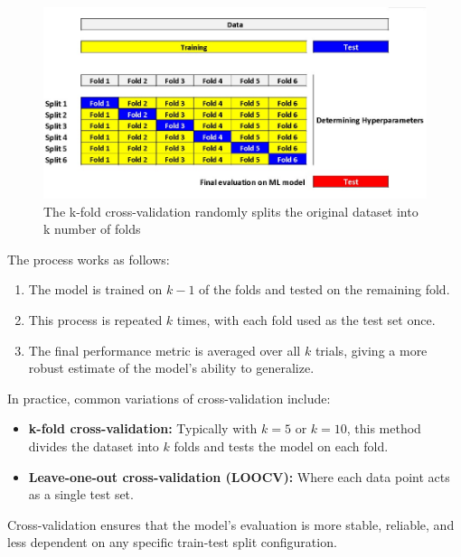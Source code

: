 \documentclass{llncs}
\begin{document}
\begin{figure}[h!]
	\begin{center}  %
		\includegraphics[width=1\textwidth]{images/Cross.jpg}
		\caption{The k-fold cross-validation randomly splits the original dataset into k number of folds\cite{kili}}
		\label{fig:cross}
	\end{center}
\end{figure}

\vspace{-20pt} 

The process works as follows:

\begin{enumerate}
	\item The model is trained on \(k-1\) of the folds and tested on the remaining fold.
	\item This process is repeated \(k\) times, with each fold used as the test set once.
	\item The final performance metric is averaged over all \(k\) trials, giving a more robust estimate of the model's ability to generalize.
\end{enumerate}



In practice, common variations of cross-validation include:
\begin{itemize}
	\item \textbf{k-fold cross-validation:} Typically with \(k = 5\) or \(k = 10\), this method divides the dataset into \(k\) folds and tests the model on each fold.
	\item \textbf{Leave-one-out cross-validation (LOOCV):} Where each data point acts as a single test set.
\end{itemize}

Cross-validation ensures that the model's evaluation is more stable, reliable, and less dependent on any specific train-test split configuration.\cite{kili}
\end{document}
